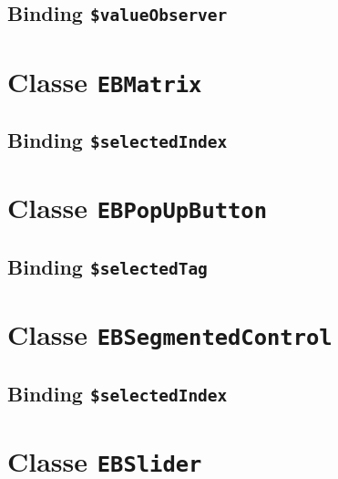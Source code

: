 \subsection{Binding \texttt{\$valueObserver}}








\section{Classe \texttt{EBMatrix}}

\subsection{Binding \texttt{\$selectedIndex}}








\section{Classe \texttt{EBPopUpButton}}

\subsection{Binding \texttt{\$selectedTag}}








\section{Classe \texttt{EBSegmentedControl}}

\subsection{Binding \texttt{\$selectedIndex}}








\section{Classe \texttt{EBSlider}}

